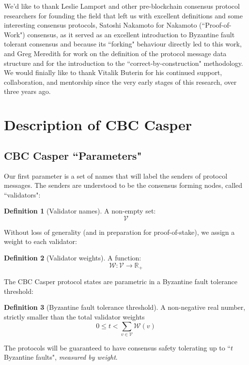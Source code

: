 \documentclass{article}
\theoremstyle{definition}
\newtheorem{defn}{Definition}[section]
\begin{document}
We'd like to thank Leslie Lamport and other pre-blockchain consensus protocol researchers for founding the field that left us with excellent definitions and some interesting consensus protocols, Satoshi Nakamoto for Nakamoto (``Proof-of-Work") consensus\cite{nakamoto}, as it served as an excellent introduction to Byzantine fault tolerant consensus and because its ``forking" behaviour directly led to this work, and Greg Meredith for work on the definition of the protocol message data structure and for the introduction to the ``correct-by-construction" methodology. We would finially like to thank Vitalik Buterin for his continued support, collaboration, and mentorship since the very early stages of this research, over three years ago.

\pagebreak
\section{Description of CBC Casper}

\subsection{CBC Casper ``Parameters"}

Our first parameter is a set of names that will label the senders of protocol messages. The senders are understood to be the consensus forming nodes, called ``validators":

\begin{defn}[Validator names]
A non-empty set:
$$
\mathcal{V}
$$
\end{defn}

Without loss of generality (and in preparation for proof-of-stake), we assign a weight to each validator:

\begin{defn}[Validator weights]
A function:
$$
\mathcal{W}: \mathcal{V} \to \mathbb{R}_+
$$
\end{defn}

The CBC Casper protocol states are parametric in a Byzantine fault tolerance threshold:

\begin{defn}[Byzantine fault tolerance threshold]
A non-negative real number, strictly smaller than the total validator weights
$$0 \leq t < \sum_{v \in \mathcal{V}} \mathcal{W}(v)$$
\end{defn}

The protocols will be guaranteed to have consensus safety tolerating up to ``$t$ Byzantine faults", \emph{measured by weight}.
\end{document}
